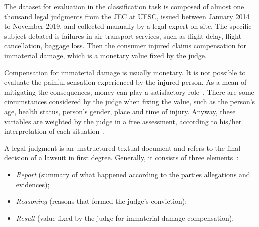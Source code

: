 The dataset for evaluation in the classification task is composed of almost one thousand legal judgments from the \gls{JEC} at \gls{UFSC}, issued between January 2014 to November 2019, and collected manually by a legal expert on site. The specific subject debated is failures in air transport services, such as flight delay, flight cancellation, baggage loss. Then the consumer injured claims compensation for immaterial damage, which is a monetary value fixed by the judge. 



Compensation for immaterial damage is usually monetary. It is not possible to evaluate the painful sensation experienced by the injured person. As a mean of mitigating the consequences, money can play a satisfactory role~\cite{Diniz2020}. There are some circumstances considered by the judge when fixing the value, such as the person’s age, health status, person’s gender, place and time of injury. Anyway, these variables are weighted by the judge in a free assessment, according to his/her interpretation of each situation~\cite{Sadiku2020}.

A legal judgment is an unstructured textual document and refers to the final decision of a lawsuit in first degree. Generally, it consists of three elements~\cite{Brazil2015}:

\begin{itemize}[noitemsep]
    \item \emph{Report} (summary of what happened according to the parties allegations and evidences);
    \item \emph{Reasoning} (reasons that formed the judge's conviction);
    \item \emph{Result} (value fixed by the judge for immaterial damage compensation). 
\end{itemize}

